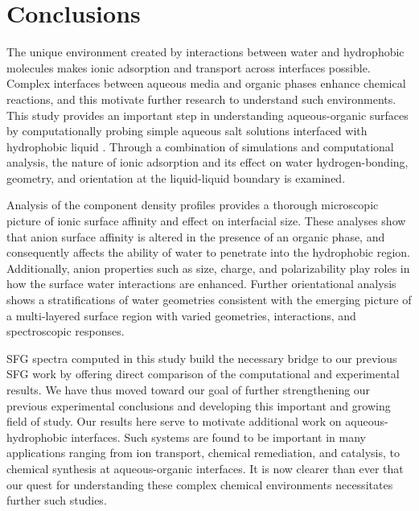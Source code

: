 \section{Conclusions}

The unique environment created by interactions between water and hydrophobic molecules makes ionic adsorption and transport across interfaces possible. Complex interfaces between aqueous media and organic phases enhance chemical reactions, and this motivate further research to understand such environments. This study provides an important step in understanding aqueous-organic surfaces by computationally probing simple aqueous salt solutions interfaced with hydrophobic liquid \ctc. Through a combination of simulations and computational analysis, the nature of ionic adsorption and its effect on water hydrogen-bonding, geometry, and orientation at the liquid-liquid boundary is examined.

Analysis of the component density profiles provides a thorough microscopic picture of ionic surface affinity and effect on interfacial size. These analyses show that anion surface affinity is altered in the presence of an organic phase, and consequently affects the ability of water to penetrate into the hydrophobic region. Additionally, anion properties such as size, charge, and polarizability play roles in how the surface water interactions are enhanced. Further orientational analysis shows a stratifications of water geometries consistent with the emerging picture of a multi-layered surface region with varied geometries, interactions, and spectroscopic responses.

SFG spectra computed in this study build the necessary bridge to our previous SFG work by offering direct comparison of the computational and experimental results. We have thus moved toward our goal of further strengthening our previous experimental conclusions and developing this important and growing field of study. Our results here serve to motivate additional work on aqueous-hydrophobic interfaces. Such systems are found to be important in many applications ranging from ion transport, chemical remediation, and catalysis, to chemical synthesis at aqueous-organic interfaces. It is now clearer than ever that our quest for understanding these complex chemical environments necessitates further such studies.

